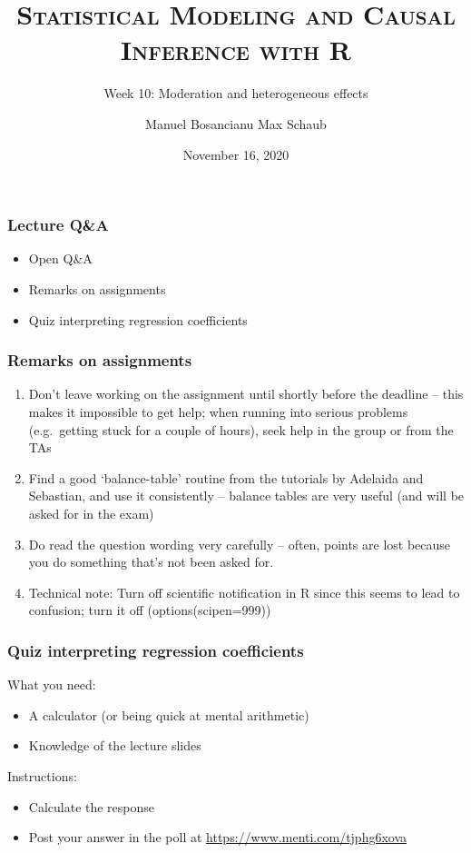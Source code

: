 \documentclass[12pt,english,dvipsnames,aspectratio=169,handout]{beamer}\usepackage[]{graphicx}\usepackage[]{xcolor}
\title{\textsc{Statistical Modeling and Causal Inference with R}}
\subtitle{Week 10: Moderation and heterogeneous effects}
\date{November 16, 2020}
\author{Manuel Bosancianu \hfill Max Schaub}
\institute{Hertie School of Governance}
\begin{document}
\maketitle


\begin{frame}
	\frametitle{Lecture Q\&A}
	\begin{itemize} \large
		\item Open Q\&A 
		\item Remarks on assignments
		\item Quiz interpreting regression coefficients
	\end{itemize}
\end{frame}


\begin{frame}
	\frametitle{Remarks on assignments}
\footnotesize

	\begin{enumerate}
		\item Don't leave working on the assignment until shortly before the deadline -- this makes it impossible to get help; when running into serious problems (e.g.\ getting stuck for a couple of hours), seek help in the group or from the TAs
		\item Find a good `balance-table' routine from the tutorials by Adelaida and Sebastian, and use it consistently -- balance tables are very useful (and will be asked for in the exam)
	  \item Do read the question wording very carefully -- often, points are lost because you do something that's not been asked for.
		\item Technical note: Turn off scientific notification in R since this seems to lead to confusion; turn it off (options(scipen=999))
	\end{enumerate}
\end{frame}



\begin{frame}
	\frametitle{Quiz interpreting regression coefficients}
\footnotesize

  What you need:
	\begin{itemize}
		\item A calculator (or being quick at mental arithmetic)
		\item Knowledge of the lecture slides
	\end{itemize}

  Instructions:
	\begin{itemize}
		\item Calculate the response
		\item Post your answer in the poll at \url{https://www.menti.com/tjphg6xova}
	\end{itemize}

\end{frame}
\end{document}

